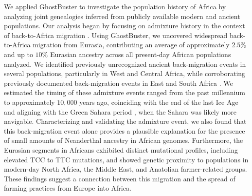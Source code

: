 We applied GhostBuster to investigate the population history of Africa by analyzing joint genealogies inferred from publicly available modern and ancient populations. Our analysis began by focusing on admixture history in the context of back-to-Africa migration \cite{pickrell2012genetic, llorente2015ancient, chen2020identifying}. Using GhostBuster, we uncovered widespread back-to-Africa migration from Eurasia, contributing an average of approximately $2.5\%$ and up to $10\%$ Eurasian ancestry across all present-day African populations analyzed. We identified previously unrecognized ancient back-migration events in several populations, particularly in West and Central Africa, while corroborating previously documented back-migration events in East and South Africa \cite{pickrell2014ancient, llorente2015ancient}. We estimated the timing of these admixture events ranged from the past millennium to approximately $10{,}000$ years ago, coinciding with the end of the last Ice Age and aligning with the Green Sahara period \cite{tierney2017rainfall, larrasoana2013dynamics}, when the Sahara was likely more navigable. Characterizing and validating the admixture event, we also found that this back-migration event alone provides a plausible explanation for the presence of small amounts of Neanderthal ancestry in African genomes. Furthermore, the Eurasian segments in Africans exhibited distinct mutational profiles, including elevated TCC to TTC mutations, and showed genetic proximity to populations in modern-day North Africa, the Middle East, and Anatolian farmer-related groups. These findings suggest a connection between this migration and the spread of farming practices from Europe into Africa.


